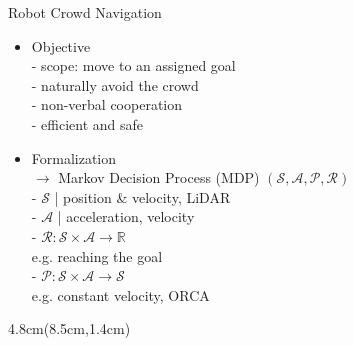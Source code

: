 \documentclass[navbaroff]{sdqbeamer}
\begin{document}
\begin{frame}[label=problem]{Robot Crowd Navigation}
    \begin{itemize}
        \item Objective\\
            \pause
            - scope: move to an assigned goal\\
            \pause
            - naturally avoid the crowd \\
            \pause
            - non-verbal cooperation \\
            \pause
            - efficient and safe
        \pause
    \item Formalization \\
        $\rightarrow$ Markov Decision Process (MDP) $(\mathcal{S,A,P,R})$\\
        \pause
            - $\mathcal{S}$ | position \& velocity, LiDAR\\
        \pause
        - $\mathcal{A}$ | acceleration, velocity\\
        \pause
        - $\mathcal{R}:\mathcal{S}\times\mathcal{A}\rightarrow\mathbb{R}$\\
        \hspace{4mm} e.g. reaching the goal\\
        \pause
        - $\mathcal{P}:\mathcal{S}\times\mathcal{A}\rightarrow \mathcal{S}$\\
        \hspace{4mm} e.g. constant velocity, ORCA
    \end{itemize}
    \begin{textblock*}{4.8cm}(8.5cm,1.4cm)
\end{textblock*}
\end{frame}
\end{document}
